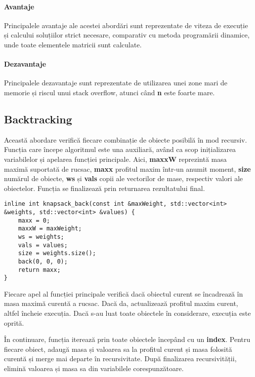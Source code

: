 \documentclass[runningheads]{llncs}
\begin{document}
\paragraph{Avantaje} Principalele avantaje ale acestei abordări sunt reprezentate de viteza
de execuție și calcului soluțiilor strict necesare, comparativ cu metoda programării dinamice,
unde toate elementele matricii sunt calculate.

\paragraph{Dezavantaje} Principalele dezavantaje sunt reprezentate de utilizarea unei zone mari de memorie
și riscul unui stack overflow, atunci când \textbf{n} este foarte mare.

\subsection{Backtracking}

Această abordare verifică fiecare combinație de obiecte posibilă în mod recursiv. Funcția care începe
algoritmul este una auxiliară, având ca scop inițializarea variabilelor și apelarea funcției principale.
Aici, \textbf{maxxW} reprezintă masa maximă suportată de rucsac, \textbf{maxx} profitul maxim într-un anumit
moment, \textbf{size} numărul de obiecte, \textbf{ws} și \textbf{vals} copii ale vectorilor de mase, respectiv
valori ale obiectelor. Funcția se finalizează prin returnarea rezultatului final.

\begin{lstlisting}
inline int knapsack_back(const int &maxWeight, std::vector<int> &weights, std::vector<int> &values) {
	maxx = 0;
	maxxW = maxWeight;
	ws = weights;
	vals = values;
	size = weights.size();
	back(0, 0, 0);
	return maxx;
}
\end{lstlisting}

Fiecare apel al funcției principale verifică dacă obiectul curent se încadrează în
masa maximă curentă a rucsac. Dacă da, actualizează profitul maxim curent, altfel încheie
execuția. Dacă s-au luat toate obiectele în considerare, execuția este oprită.

În continuare, funcția iterează prin toate obiectele începând cu un \textbf{index}. Pentru
fiecare obiect, adaugă masa și valoarea sa la profitul curent și masa folosită curentă și
merge mai departe în recursivitate. După finalizarea recursivității, elimină valoarea și
masa sa din variabilele corespunzătoare.
\end{document}
